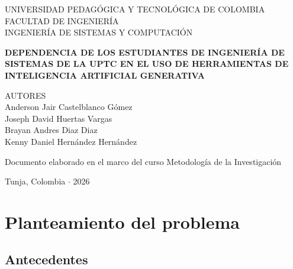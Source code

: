 \documentclass[12pt,letterpaper]{article}
\begin{document}
\begin{titlepage}
\begin{center}
\vspace*{1cm}

{\MakeUppercase{Universidad Pedagógica y Tecnológica de Colombia}}\\[0.3cm]
{\MakeUppercase{Facultad de Ingeniería}}\\[0.3cm]
{\MakeUppercase{Ingeniería de Sistemas y Computación}}

\vfill

{\bfseries DEPENDENCIA DE LOS ESTUDIANTES DE INGENIERÍA DE SISTEMAS DE LA UPTC EN EL USO DE HERRAMIENTAS DE INTELIGENCIA ARTIFICIAL GENERATIVA}\\[0.5cm]

\vfill

{\MakeUppercase{Autores}}\\[0.3cm]
{Anderson Jair Castelblanco Gómez}\\
{Joseph David Huertas Vargas}\\
{Brayan Andres Diaz Diaz}\\
{Kenny Daniel Hernández Hernández}

\vfill

{\small Documento elaborado en el marco del curso Metodología de la Investigación}

\vfill

{Tunja, Colombia $\cdot$ 2026}

\end{center}
\end{titlepage}


\setcounter{page}{2}

\tableofcontents
\newpage

\listoftables
{}

\newpage

\listoffigures
{}

\newpage


\section{Planteamiento del problema}

\subsection{Antecedentes}
\end{document}
